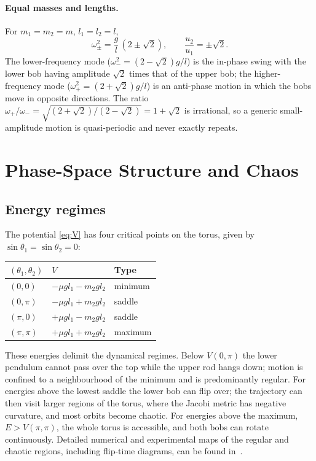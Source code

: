\documentclass[11pt,a4paper]{book}
\theoremstyle{definition}
\theoremstyle{remark}
\begin{document}
\paragraph{Equal masses and lengths.} For $m_1=m_2=m$, $l_1=l_2=l$,
\begin{equation}
  \omega_\pm^2=\frac gl\,(2\pm\sqrt2),\qquad \frac{u_2}{u_1}=\pm\sqrt2 .
\end{equation}
The lower-frequency mode ($\omega_-^2=(2-\sqrt2)g/l$) is the in-phase swing with the lower bob having amplitude
$\sqrt2$ times that of the upper bob; the higher-frequency mode ($\omega_+^2=(2+\sqrt2)g/l$) is an anti-phase
motion in which the bobs move in opposite directions. The ratio $\omega_+/\omega_-=\sqrt{(2+\sqrt2)/(2-\sqrt2)}=1+\sqrt2$
is irrational, so a generic small-amplitude motion is quasi-periodic and never exactly repeats.

\section{Phase-Space Structure and Chaos}
\label{sec:chaos}

\subsection{Energy regimes}

The potential \eqref{eq:V} has four critical points on the torus, given by $\sin\theta_1=\sin\theta_2=0$:
\begin{center}
\begin{tabular}{@{}lll@{}}
\toprule
$(\theta_1,\theta_2)$ & $V$ & Type\\
\midrule
$(0,0)$ & $-\mu g l_1-m_2gl_2$ & minimum\\
$(0,\pi)$ & $-\mu g l_1+m_2gl_2$ & saddle\\
$(\pi,0)$ & $+\mu g l_1-m_2gl_2$ & saddle\\
$(\pi,\pi)$ & $+\mu g l_1+m_2gl_2$ & maximum\\
\bottomrule
\end{tabular}
\end{center}
These energies delimit the dynamical regimes. Below $V(0,\pi)$ the lower pendulum cannot pass over the top
while the upper rod hangs down; motion is confined to a neighbourhood of the minimum and is predominantly regular.
For energies above the lowest saddle the lower bob can flip over; the trajectory can then visit larger regions of the
torus, where the Jacobi metric has negative curvature, and most orbits become chaotic. For energies above
the maximum, $E>V(\pi,\pi)$, the whole torus is accessible, and both bobs can rotate continuously. Detailed numerical and experimental maps of the regular and chaotic regions, including flip-time diagrams, can be found in~\cite{shinbrot,levien,stachowiak}.
\end{document}
